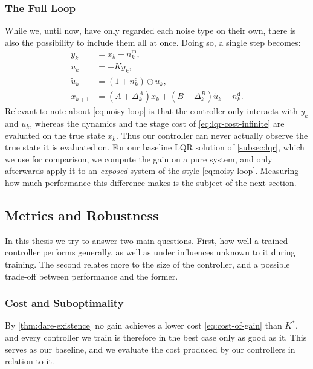 \subsubsection{The Full Loop}
\label{subsubsec:full-noise}
While we, until now, have only regarded each noise type on their own,
there is also the possibility to include them all at once. Doing so,
a single step becomes:
\begin{subequations}
\label{eq:noisy-loop}
\begin{align}
    y_k     &= x_k + n^{\mathrm{m}}_k , \label{eq:noisy-obs}\\
    u_k     &= -K y_k , \label{eq:noisy-ctrl}\\
    \tilde{u}_k     &= \left( 1 + n^{\mathrm{c}}_k \right) \odot u_k , \label{eq:noisy-act}\\
    x_{k+1} &= \left( A + \Delta_k^{A} \right) x_k + \left( B + \Delta_k^{B} \right) \tilde{u}_k + n^{\mathrm{d}}_k . \label{eq:noisy-dyn}
\end{align}
\end{subequations}
Relevant to note about \eqref{eq:noisy-loop} is that the controller only 
interacts with $y_k$ and $u_k$, whereas the dynamics
and the stage cost of \eqref{eq:lqr-cost-infinite} are evaluated on the true
state $x_k$. Thus our controller can never actually observe the true state it is
evaluated on. For our baseline LQR solution of \cref{subsec:lqr}, which we use for comparison,
we compute the gain on a pure system, and only afterwards apply it to an
\emph{exposed} system of the style \eqref{eq:noisy-loop}. Measuring how much
performance this difference makes is the subject of the next section.
 
\subsection{Metrics and Robustness}
\label{subsec:robustness}

In this thesis we try to answer two main questions. First, how well a 
trained controller performs generally, as well as under influences
unknown to it during training. The second relates more to the size
of the controller, and a possible trade-off between performance and
the former.

\subsubsection{Cost and Suboptimality}
\label{subsubsec:suboptimality}

By \cref{thm:dare-existence} no gain achieves a
lower cost \eqref{eq:cost-of-gain} than $K^{*}$, and every controller we
train is therefore in the best case only as good as it. This serves as our
baseline, and we evaluate the cost produced by our controllers in relation to
it.

